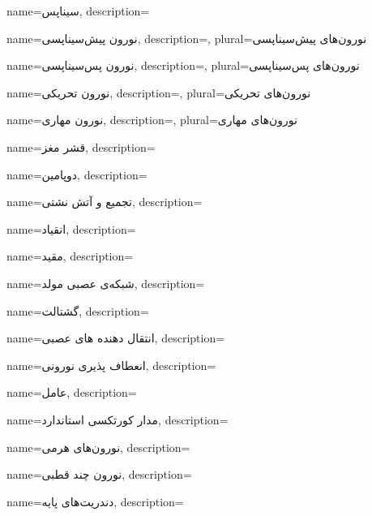 {
	name={سیناپس},
	description=\hfill{}
}

{
	name={نورون پیش‌سیناپسی},
	description=\hfill{},
    plural={نورون‌های پیش‌سیناپسی}
}

{
	name={نورون پس‌سیناپسی},
	description=\hfill{},
    plural={نورون‌های پس‌سیناپسی}
}

{
	name={نورون تحریکی},
	description=\hfill{},
    plural={نورون‌های تحریکی}
}

{
	name={نورون مهاری},
	description=\hfill{},
    plural={نورون‌های مهاری}
}

{
	name={قشر مغز},
	description=\hfill{}
}

{
    name={دوپامین},
    description=\hfill{}
}

{
    name={تجمیع و آتش نشتی},
    description=\hfill{}
}


{
	name={انقیاد},
	description=\hfill{}
}

{
name={مقید},
description=\hfill{}
}

{
name={شبکه‌ی عصبی مولد},
description=\hfill{}
}

{
	name={گشتالت},
	description=\hfill{}
}

{
	name={انتقال دهنده های عصبی},
	description=\hfill{}
}

{
	name={انعطاف پذیری نورونی},
	description=\hfill{}
}

{
	name={عامل},
	description=\hfill{}
}

{
	name={مدار کورتکسی استاندارد},
	description=\hfill{}
}

{
	name={نورون‌های هرمی},
	description=\hfill{}
}

{
name={نورون چند قطبی},
description=\hfill{}
}

{
name={دندریت‌های پایه},
description=\hfill{}
}


